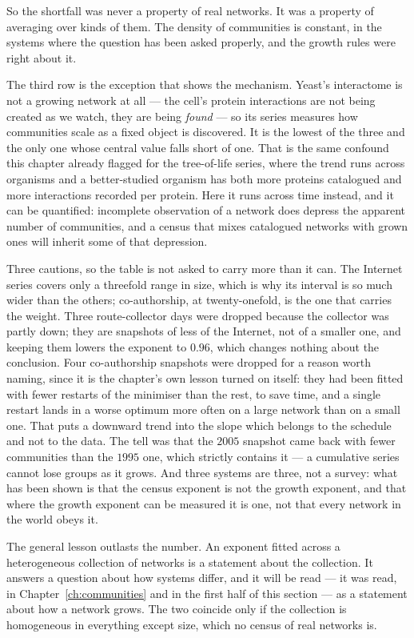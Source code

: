 So the shortfall was never a property of real networks. It was a property of
averaging over kinds of them. The density of communities is constant, in the
systems where the question has been asked properly, and the growth rules were
right about it.

The third row is the exception that shows the mechanism. Yeast's interactome is
not a growing network at all --- the cell's protein interactions are not being
created as we watch, they are being \emph{found} --- so its series measures how
communities scale as a fixed object is discovered. It is the lowest of the three
and the only one whose central value falls short of one. That is the same confound
this chapter already flagged for the tree-of-life series, where the trend runs
across organisms and a better-studied organism has both more proteins catalogued
and more interactions recorded per protein. Here it runs across time instead, and
it can be quantified: incomplete observation of a network does depress the
apparent number of communities, and a census that mixes catalogued networks with
grown ones will inherit some of that depression.

Three cautions, so the table is not asked to carry more than it can. The
Internet series covers only a threefold range in size, which is why its interval
is so much wider than the others; co-authorship, at twenty-onefold, is the one
that carries the weight. Three route-collector days were dropped because the
collector was partly down; they are snapshots of less of the Internet, not of a
smaller one, and keeping them lowers the exponent to $0.96$, which changes nothing
about the conclusion. Four co-authorship snapshots were dropped for a reason worth
naming, since it is the chapter's own lesson turned on itself: they had been fitted
with fewer restarts of the minimiser than the rest, to save time, and a single
restart lands in a worse optimum more often on a large network than on a small one.
That puts a downward trend into the slope which belongs to the schedule and not to
the data. The tell was that the $2005$ snapshot came back with fewer communities
than the $1995$ one, which strictly contains it --- a cumulative series cannot lose
groups as it grows. And three systems are three, not a survey: what has been
shown is that the census exponent is not the growth exponent, and that where the
growth exponent can be measured it is one, not that every network in the world
obeys it.

The general lesson outlasts the number. An exponent fitted across a heterogeneous
collection of networks is a statement about the collection. It answers a question
about how systems differ, and it will be read --- it was read, in
Chapter~\ref{ch:communities} and in the first half of this section --- as a
statement about how a network grows. The two coincide only if the collection is
homogeneous in everything except size, which no census of real networks is.

